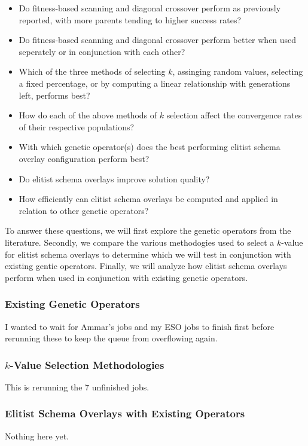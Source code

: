 \begin{itemize}
\item Do fitness-based scanning and diagonal crossover perform as previously reported, with more parents tending to higher success rates?
\item Do fitness-based scanning and diagonal crossover perform better when used seperately or in conjunction with each other? 
\item Which of the three methods of selecting $k$, assinging random values, selecting a fixed percentage, or by computing a linear relationship with generations left, performs best?
\item How do each of the above methods of $k$ selection affect the convergence rates of their respective populations?
\item With which genetic operator(s) does the best performing elitist schema overlay configuration perform best?
\item Do elitist schema overlays improve solution quality?
\item How efficiently can elitist schema overlays be computed and applied in relation to other genetic operators?
\end{itemize}

To answer these questions, we will first explore the genetic operators from the literature. Secondly, we compare the various methodogies used to select a $k$-value for elitist schema overlays to determine which we will test in conjunction with existing gentic operators. Finally, we will analyze how elitist schema overlays perform when used in conjunction with existing genetic operators.

\subsubsection*{Existing Genetic Operators}
I wanted to wait for Ammar's jobs and my ESO jobs to finish first before rerunning these to keep the queue from overflowing again.

\subsubsection*{$k$-Value Selection Methodologies}
This is rerunning the 7 unfinished jobs.

\subsubsection*{Elitist Schema Overlays with Existing Operators}
Nothing here yet.